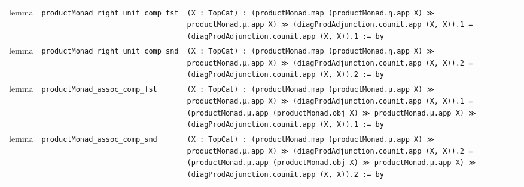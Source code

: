 \documentclass[12pt]{article}
\begin{document}
\begin{center}
\begin{tabular}{lll}
lemma & \texttt{productMonad\_right\_unit\_comp\_fst} & \texttt{(X : TopCat) : (productMonad.map (productMonad.η.app X) ≫ productMonad.μ.app X) ≫ (diagProdAdjunction.counit.app (X, X)).1 = (diagProdAdjunction.counit.app (X, X)).1 := by} \\
lemma & \texttt{productMonad\_right\_unit\_comp\_snd} & \texttt{(X : TopCat) : (productMonad.map (productMonad.η.app X) ≫ productMonad.μ.app X) ≫ (diagProdAdjunction.counit.app (X, X)).2 = (diagProdAdjunction.counit.app (X, X)).2 := by} \\
lemma & \texttt{productMonad\_assoc\_comp\_fst} & \texttt{(X : TopCat) : (productMonad.map (productMonad.μ.app X) ≫ productMonad.μ.app X) ≫ (diagProdAdjunction.counit.app (X, X)).1 = (productMonad.μ.app (productMonad.obj X) ≫ productMonad.μ.app X) ≫ (diagProdAdjunction.counit.app (X, X)).1 := by} \\
lemma & \texttt{productMonad\_assoc\_comp\_snd} & \texttt{(X : TopCat) : (productMonad.map (productMonad.μ.app X) ≫ productMonad.μ.app X) ≫ (diagProdAdjunction.counit.app (X, X)).2 = (productMonad.μ.app (productMonad.obj X) ≫ productMonad.μ.app X) ≫ (diagProdAdjunction.counit.app (X, X)).2 := by} \\
\end{tabular}
\end{center}
\end{document}
